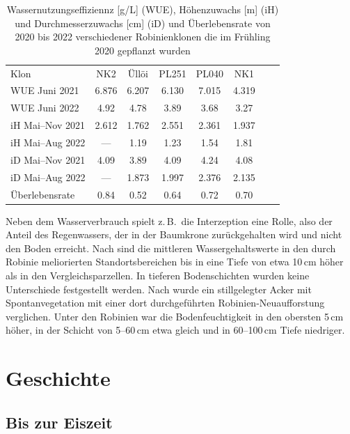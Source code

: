 \documentclass[twocolumn]{scrartcl}
\begin{document}
\begin{table}[htbp]
  \centering
  \begin{tabular}{l *{7}{S[table-format=1.3]}}
    Klon    &  {NK2} & {Üllöi} & {PL251} & {PL040} & {NK1} \\[.3em]
    WUE Juni 2021 & 6.876 & 6.207 & 6.130 & 7.015 & 4.319 \\
    WUE Juni 2022 &  4.92 & 4.78 & 3.89 & 3.68 & 3.27 \\[.3em]
    iH Mai--Nov 2021 & 2.612 & 1.762 & 2.551 & 2.361 & 1.937 \\
    iH Mai--Aug 2022 & {---} & 1.19 & 1.23 & 1.54 & 1.81 \\[.3em]
    iD Mai--Nov 2021 & 4.09 & 3.89 & 4.09 & 4.24 & 4.08 \\
    iD Mai--Aug 2022 & {---} & 1.873 & 1.997 & 2.376 & 2.135\\[.3em]
    Überlebensrate & 0.84 & 0.52 & 0.64 & 0.72 & 0.70
  \end{tabular}
  \caption{Wassernutzungseffiziennz [g/L] (WUE), Höhenzuwachs [m] (iH) und
    Durchmesserzuwachs [cm] (iD) und Überlebensrate von 2020 bis 2022 verschiedener Robinienklonen die im
    Frühling 2020 gepflanzt wurden
  \citep{abri2022robinieTrokenresistenz,abri2023robiieWasser,abri2023robinieDroughtTolerance}}
  \label{tab:WUErobinie}
\end{table}

Neben dem Wasserverbrauch spielt z.\,B.\ die Interzeption eine Rolle,
also der Anteil des Regenwassers, der in der Baumkrone zurückgehalten
wird und nicht den Boden erreicht.
Nach \citet{gemeinhardt1959robinie} sind die mittleren
Wassergehaltswerte in den durch Robinie meliorierten
Standortsbereichen bis in eine Tiefe von etwa 10\,cm höher als in den
Vergleichsparzellen. In tieferen Bodenschichten wurden keine
Unterschiede festgestellt werden.
Nach \citet{kou2016robinieBoden} wurde ein stillgelegter Acker mit
Spontanvegetation mit einer dort durchgeführten
Robinien-Neuaufforstung verglichen. Unter den Robinien war die
Bodenfeuchtigkeit in den obersten 5\,cm höher, in der Schicht von
5--60\,cm etwa gleich und in 60--100\,cm Tiefe niedriger.

\section{Geschichte}

\subsection{Bis zur Eiszeit}
\end{document}
